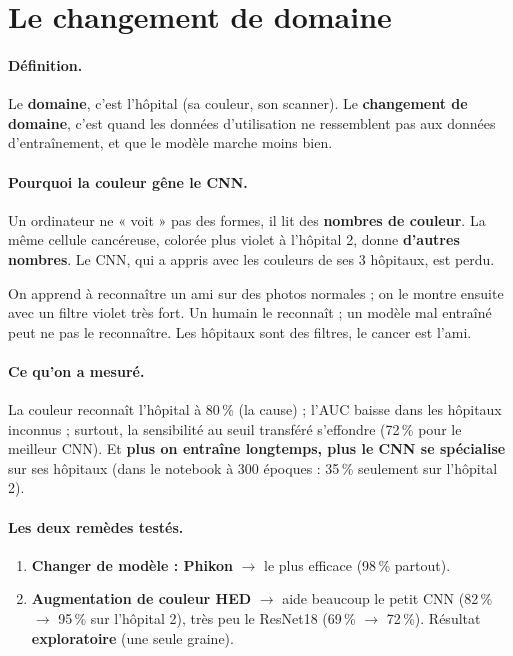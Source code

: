 \documentclass[11pt,a4paper]{article}
\begin{document}
\section{Le changement de domaine}\label{sec:domaine}

\paragraph{Définition.} Le \textbf{domaine}, c'est l'hôpital (sa couleur, son scanner). Le \textbf{changement de domaine}, c'est quand
les données d'utilisation ne ressemblent pas aux données d'entraînement, et que le modèle marche moins bien.

\paragraph{Pourquoi la couleur gêne le CNN.} Un ordinateur ne « voit » pas des formes, il lit des \textbf{nombres de couleur}. La même
cellule cancéreuse, colorée plus violet à l'hôpital 2, donne \textbf{d'autres nombres}. Le CNN, qui a appris avec les couleurs de ses
3 hôpitaux, est perdu.
\begin{analogie}
On apprend à reconnaître un ami sur des photos normales ; on le montre ensuite avec un filtre violet très fort. Un humain le
reconnaît ; un modèle mal entraîné peut ne pas le reconnaître. Les hôpitaux sont des filtres, le cancer est l'ami.
\end{analogie}

\paragraph{Ce qu'on a mesuré.} La couleur reconnaît l'hôpital à 80\,\% (la cause) ; l'AUC baisse dans les hôpitaux inconnus ; surtout,
la sensibilité au seuil transféré s'effondre (72\,\% pour le meilleur CNN). Et \textbf{plus on entraîne longtemps, plus le CNN se
spécialise} sur ses hôpitaux (dans le notebook à 300 époques : 35\,\% seulement sur l'hôpital 2).

\paragraph{Les deux remèdes testés.}
\begin{enumerate}
  \item \textbf{Changer de modèle : Phikon} $\to$ le plus efficace (98\,\% partout).
  \item \textbf{Augmentation de couleur HED} $\to$ aide beaucoup le petit CNN (82\,\% $\to$ 95\,\% sur l'hôpital 2), très peu le
        ResNet18 (69\,\% $\to$ 72\,\%). Résultat \textbf{exploratoire} (une seule graine).
\end{enumerate}
\end{document}
